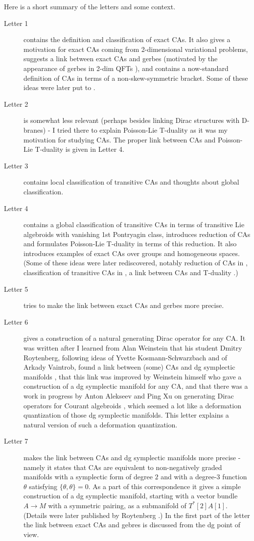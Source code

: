 \documentclass{article}
\begin{document}
Here is a short summary of the letters and some context.
\begin{description}
\item[Letter 1] contains the definition  and classification of exact CAs. It also gives a motivation for exact CAs coming from 2-dimensional variational problems, suggests a link between exact CAs and gerbes (motivated by the appearance of gerbes in 2-dim QFTs \cite{bry,gaw}), and contains a now-standard definition of CAs in terms of a non-skew-symmetric bracket. Some of these ideas were later put to \cite{SW}.
\item[Letter 2] is somewhat less relevant (perhaps besides linking Dirac structures with D-branes) - I tried there to explain  Poisson-Lie T-duality as it was my motivation for studying CAs. The proper link between CAs and Poisson-Lie T-duality is given  in Letter 4.
\item[Letter 3] contains local classification of transitive CAs and thoughts about global classification.
\item[Letter 4] contains a global classification of transitive CAs in terms of transitive Lie algebroids with vanishing 1st Pontryagin class, introduces reduction of CAs and formulates Poisson-Lie T-duality in terms of this reduction. It also introduces  examples of exact CAs over groups and homogeneous spaces. (Some of these ideas were later rediscovered, notably reduction of CAs in \cite{bur}, classification of transitive CAs in \cite{xu}, a link between CAs and T-duality \cite{cg}.)
\item[Letter 5] tries to make the link between exact CAs and gerbes more precise.
\item[Letter 6] gives a construction of a natural generating Dirac operator for any CA. It was written after I learned from Alan Weinstein that his student Dmitry Roytenberg, following ideas of Yvette Kosmann-Schwarzbach and of Arkady Vaintrob, found a link between (some) CAs and dg symplectic manifolds \cite{Rth}, that this link was improved by Weinstein himself who gave a construction of a dg symplectic manifold for any CA, and that there was a work in progress by Anton Alekseev and Ping Xu on generating Dirac operators for Courant algebroids \cite{ax}, which seemed a lot like a deformation quantization of those dg symplectic manifolds. This letter explains a natural version of such a deformation quantization.
\item[Letter 7] makes the link between  CAs and dg symplectic manifolds more precise - namely it states that CAs are equivalent to non-negatively graded  manifolds with a symplectic form of degree $2$ and with a degree-3 function $\theta$ satisfying $\{\theta,\theta\}=0$. As a part of this correspondence it gives a simple construction of a dg symplectic manifold, starting with a vector bundle $A\to M$ with a symmetric pairing, as a submanifold of $T^*[2]A[1]$. (Details were later published by Roytenberg \cite{Rst}.) In the first part of the letter the link between exact CAs and gebres is discussed from the dg point of view.

\end{description}
\end{document}
